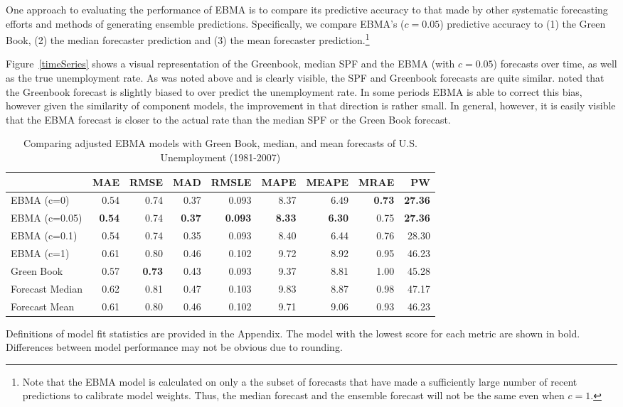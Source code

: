 \documentclass[12pt,fullpage,endnotes]{article}
\begin{document}
One approach to evaluating the performance of EBMA is to compare its
predictive accuracy to that made by other systematic forecasting
efforts and methods of generating ensemble predictions.  Specifically,
we compare EBMA's ($c=0.05$) predictive accuracy to (1) the Green
Book, (2) the median forecaster prediction and (3) the mean forecaster
prediction.\footnote{Note that the EBMA model is calculated on only a
  the subset of forecasts that have made a sufficiently large number
  of recent predictions to calibrate model weights.  Thus, the median
  forecast and the ensemble forecast will not be the same even when
  $c=1$.  } 

Figure~\ref{timeSeries} shows a visual representation of the
Greenbook, median SPF and the EBMA (with $c=0.05$) forecasts over
time, as well as the true unemployment rate. As was noted above and is
clearly visible, the SPF and Greenbook forecasts are quite
similar. \citet{Baghestani:2008} noted that the Greenbook forecast is
slightly biased to over predict the unemployment rate. In some periods
EBMA is able to correct this bias, however given the similarity of
component models, the improvement in that direction is rather
small. In general, however, it is easily visible that the EBMA
forecast is closer to the actual rate than the median SPF or the Green
Book forecast.

\begin{table}[h]
\caption{Comparing adjusted EBMA models with Green Book, median, and mean forecasts of U.S. Unemployment (1981-2007)}
\begin{center}
\begin{tabular}{lrrrrrrrr}
\toprule
 & MAE & RMSE & MAD & RMSLE & MAPE & MEAPE & MRAE & PW \\ 
\midrule
 EBMA (c=0)& 0.54 & 0.74 & 0.37 & 0.093 & 8.37 & 6.49 & \textbf{0.73} & \textbf{27.36} \\ 
  EBMA (c=0.05)& \textbf{0.54} & 0.74 &\textbf{ 0.37} & \textbf{0.093} & \textbf{8.33} & \textbf{6.30} & 0.75 & \textbf{27.36} \\ 
 EBMA (c=0.1)& 0.54 & 0.74 & 0.35 & 0.093 & 8.40 & 6.44 & 0.76 & 28.30 \\ 
EBMA (c=1) & 0.61 & 0.80 & 0.46 & 0.102 & 9.72 & 8.92 & 0.95 & 46.23 \\ 
 Green Book& 0.57 & \textbf{0.73} & 0.43 & 0.093 & 9.37 & 8.81 & 1.00 & 45.28 \\ 
 Forecast Median& 0.62 & 0.81 & 0.47 & 0.103 & 9.83 & 8.87 & 0.98 & 47.17 \\ 
Forecast Mean& 0.61 & 0.80 & 0.46 & 0.102 & 9.71 & 9.06 & 0.93 & 46.23 \\ 
\bottomrule
\end{tabular}
\end{center}

\label{compareTable1}
Definitions of model fit statistics are provided in the Appendix. The model with the lowest score for each metric are shown in bold.  Differences between model performance may not be obvious due to rounding.
\end{table}
\end{document}
